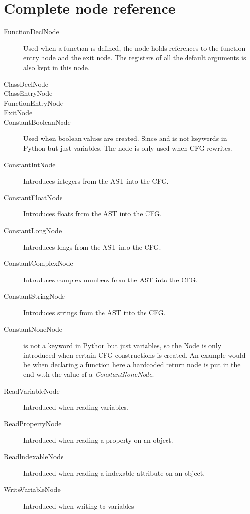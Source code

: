 \chapter{Complete node reference}
\label{chapter:NodeRef}

\begin{description}
	\item[FunctionDeclNode ] Used when a function is defined, the node holds references to the function entry node and the exit node. The registers of all the default arguments is also kept in this node.
	\item[ClassDeclNode ]  
	\item[ClassEntryNode]
	\item[FunctionEntryNode] 
	\item[ExitNode] 
	\item[ConstantBooleanNode] Used when boolean values are created. Since  and  is not keywords in Python but just variables. The node is only used when CFG rewrites. 
	\item[ConstantIntNode] Introduces integers from the AST into the CFG.
	\item[ConstantFloatNode] Introduces floats from the AST into the CFG.
	\item[ConstantLongNode] Introduces longs from the AST into the CFG.
	\item[ConstantComplexNode] Introduces complex numbers from the AST into the CFG.
	\item[ConstantStringNode] Introduces strings from the AST into the CFG.
	\item[ConstantNoneNode]  is not a keyword in Python but just variables, so the Node is only introduced when certain CFG constructions is created. An example would be when declaring a function here a hardcoded return node is put in the end with the value of a \textit{ConstantNoneNode}.
	\item[ReadVariableNode ] Introduced when reading variables.
	\item[ReadPropertyNode ] Introduced when reading a property on an object.
	\item[ReadIndexableNode ] Introduced when reading a indexable attribute on an object.
	\item[WriteVariableNode ] Introduced when writing to variables

\end{description}
